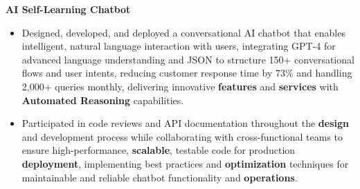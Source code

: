 \documentclass[a4paper,10pt]{article}
\begin{document}
\vspace{-2mm}
\textbf{AI Self-Learning Chatbot} \\
\begin{itemize}[leftmargin=*, itemsep=0pt, parsep=1pt]
\vspace{-7mm}
    \item Designed, developed, and deployed a conversational AI chatbot that enables intelligent, natural language interaction with users, integrating GPT-4 for advanced language understanding and JSON to structure 150+ conversational flows and user intents, reducing customer response time by 73\% and handling 2,000+ queries monthly, delivering innovative \textbf{features} and \textbf{services} with \textbf{Automated Reasoning} capabilities.
    \item Participated in code reviews and API documentation throughout the \textbf{design} and development process while collaborating with cross-functional teams to ensure high-performance, \textbf{scalable}, testable code for production \textbf{deployment}, implementing best practices and \textbf{optimization} techniques for maintainable and reliable chatbot functionality and \textbf{operations}.
\end{itemize}

\vspace{-2mm}
\end{document}
